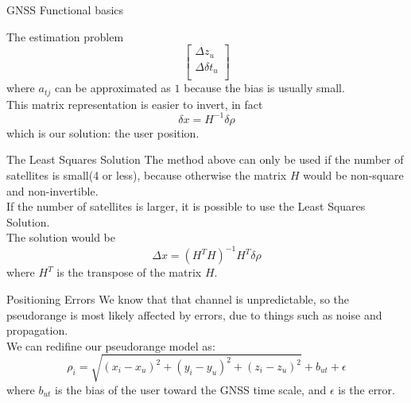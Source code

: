 \begin{section}{GNSS Functional basics}
\begin{subsection}{The estimation problem}
\begin{equation}
\begin{bmatrix}
          \Delta z_u\\
          \Delta \delta t_u\\
        \end{bmatrix}
        \label{eq:GNSS linearized matrix}
      \end{equation}
      where $a_{tj}$ can be approximated as $1$ because the bias is usually small.\\
      This matrix representation is easier to invert, in fact 
      \begin{equation*}
        \delta x= H^{-1}\delta \rho
      \end{equation*}
      which is our solution: the user position.\\
      \begin{subsubsection}{The Least Squares Solution}
        The method above can only be used if the number of satellites is small(4 or less), because 
        otherwise the matrix $H$ would be non-square and non-invertible.\\
        If the number of satellites is larger, it is possible to use the Least Squares Solution.\\
        The solution would be 
        \begin{equation}
          \Delta x = (H^TH)^{-1}H^T\delta \rho
          \label{eq:GNSS least squares}
        \end{equation}
        where $H^T$ is the transpose of the matrix $H$.\\
      \end{subsubsection}
      \end{subsection}

    \begin{section}{Positioning Errors}
      We know that that channel is unpredictable, so the pseudorange is most likely affected by errors,
      due to things such as noise and propagation.\\
      We can redifine our pseudorange model as:
      \begin{equation}
        \rho_i = \sqrt{(x_i - x_u)^2 + (y_i - y_u)^2 + (z_i - z_u)^2} + b_{ut} + \epsilon
        \label{eq:GNSS pseudorange error}
      \end{equation}
      where $b_{ut}$ is the bias of the user toward the GNSS time scale, and $\epsilon$ is the error.\\


\end{section}
\end{section}

